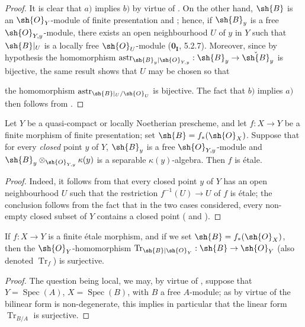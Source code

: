 \begin{proof}
It is clear that $a)$ implies $b)$ by virtue of .
On the other hand, $\sh{B}$ is an $\sh{O}_Y$-module of finite presentation  and ; hence, if $\sh{B}_y$ is a free $\sh{O}_{Y,y}$-module, there exists an open neighbourhood $U$ of $y$ in $Y$ such that $\sh{B}|_U$ is a locally free $\sh{O}_U$-module ($\mathbf{0}_{\mathbf I}$, 5.2.7).  Moreover, since by hypothesis the homomorphism $\operatorname{astr}_{\sh{B}_y|\sh{O}_{Y,y}}:\sh{B}_y\to\check{\sh{B}}_y$ is bijective, the same result shows that $U$ may be chosen so that


the homomorphism $\operatorname{astr}_{\sh{B}|_U/\sh{O}_U}$ is bijective.
The fact that $b)$ implies $a)$ then follows from .
\end{proof}

\begin{corollary}[18.2.5]
\label{IV.18.2.5}
Let $Y$ be a quasi-compact or locally Noetherian prescheme, and let $f:X\to Y$ be a finite morphism of finite presentation;
set $\sh{B}=f_*(\sh{O}_X)$.
Suppose that for every \emph{closed} point $y$ of $Y$, $\sh{B}_y$ is a free $\sh{O}_{Y,y}$-module and $\sh{B}_y\otimes_{\sh{O}_{Y,y}}\kappa(y)$ is a separable $\kappa(y)$-algebra.
Then $f$ is \'etale.
\end{corollary}

\begin{proof}
Indeed, it follows from  that every closed point $y$ of $Y$ has an open neighbourhood $U$ such that the restriction $f^{-1}(U)\to U$ of $f$ is \'etale;
the conclusion follows from the fact that in the two cases considered, every non-empty closed subset of $Y$ contains a closed point ( and ).
\end{proof}

\begin{corollary}[18.2.6]
\label{IV.18.2.6}
If $f:X\to Y$ is a finite \'etale morphism, and if we set $\sh{B}=f_*(\sh{O}_X)$, then the $\sh{O}_Y$-homomorphism $\operatorname{Tr}_{\sh{B}|\sh{O}_Y}:\sh{B}\to\sh{O}_Y$  (also denoted $\operatorname{Tr}_f$) is surjective.
\end{corollary}

\begin{proof}
The question being local, we may, by virtue of , suppose that $Y=\operatorname{Spec}(A)$, $X=\operatorname{Spec}(B)$, with $B$ a free $A$-module;
as by virtue of  the bilinear form  is non-degenerate, this implies in particular that the linear form $\operatorname{Tr}_{B/A}$ is surjective.
\end{proof}


